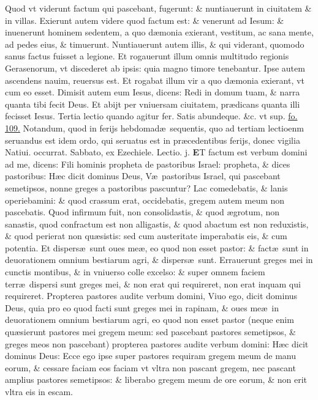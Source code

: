 \documentclass[a5paper,10pt]{book}
\def\leftmarginnote{%
	\lrmarginnote{\hskip -\marginparsep \hskip -6.5em}}
\def\rightmarginnote{%
	\lrmarginnote{\hskip\columnwidth \hskip -1em}}
\def\ae{æ}
\begin{document}
\begin{multicols*}{2}
Quod vt viderunt factum qui pascebant, fugerunt: \& nuntiauerunt in ciuitatem \& in villas.
Exierunt autem videre quod factum est: \& venerunt ad Iesum: \& inuenerunt hominem sedentem, a quo d\ae monia exierant, vestitum, ac sana mente, ad pedes eius, \& timuerunt.
Nuntiauerunt autem illis, \& qui viderant, quomodo sanus factus fuisset a legione.
Et rogauerunt illum omnis multitudo regionis Gerasenorum, vt discederet ab ipsis: quia magno timore tenebantur.
Ipse autem ascendens nauim, reuersus est.
Et rogabat illum vir a quo d\ae monia exierant, vt cum eo esset.
Dimisit autem eum Iesus, dicens: Redi in domum tuam, \& narra quanta tibi fecit Deus.
Et abijt per vniuersam ciuitatem, pr\ae dicans quanta illi fecisset Iesus.
\newline \color{red} Tertia lectio quando agitur fer. \color{black} Satis abundeque. \&c. \color{red} vt sup. \color{black} \hyperlink{page.109}{fo. 109.}
\newline \color{red} Notandum, quod in ferijs hebdomad\ae \ sequentis, quo ad tertiam lectioenm seruandus est idem ordo, qui seruatus est in pr\ae cedentibus ferijs, donec vigilia Natiui. occurrat. \color{black}
\newline {} \color{red} \hypertarget{SAT-TERTIA-ADV}{Sabbato,} ex Ezechiele. \hfill Lectio. j. \color{black}
\vspace{-.25em}
\lettrine[lines=2]{\bfseries E}{}T\leftmarginnote{\begin{flushright}c. 34.\\a\end{flushright}} factum est verbum domini ad me, dicens: Fili hominis propheta de pastoribus Israel: propheta, \& dices pastoribus: H\ae c dicit dominus Deus, V\ae \ pastoribus
Israel, qui pascebant semetipsos, nonne greges a pastoribus pascuntur?
Lac comedebatis, \& lanis operiebamini: \& quod crassum erat, occidebatis, gregem autem meum non pascebatis.
Quod infirmum fuit, non consolidastis, \& quod \ae grotum, non sanastis, quod confractum est non alligastis, \& quod abactum est non reduxistis, \& quod perierat non qu\ae sistis: sed cum austeritate imperabatis eis, \& cum potentia.
Et dispers\ae \ sunt oues me\ae , eo quod non esset pastor: \& fact\ae \ sunt in deuorationem omnium bestiarum agri, \& dispers\ae \ sunt.
Errauerunt greges mei in cunctis montibus, \& in vniuerso colle excelso: \& super omnem faciem terr\ae \ dispersi sunt greges mei, \& non erat qui requireret, non erat inquam qui requireret.
Propterea pastores audite verbum domini, Viuo ego, dicit dominus Deus, quia pro eo quod facti sunt greges mei in rapinam, \& oues me\ae \ in deuorationem omnium bestiarum agri, eo quod non esset pastor (neque enim qu\ae sierunt pastores mei gregem meum: sed pascebant pastores semetipsos, \& greges meos non pascebant) propterea pastores audite verbum domini: H\ae c dicit dominus Deus: Ecce ego ipse super pastores requiram gregem meum de manu eorum, \& cessare faciam eos faciam vt vltra non pascant gregem, nec pascant amplius pastores semetipsos: \& liberabo gregem meum de ore eorum, \& non erit vltra eis in escam. \textdagger \ \rightmarginnote{B}

\end{multicols*}
\end{document}
